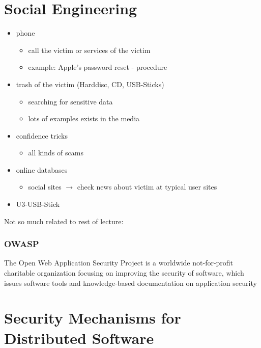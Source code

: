 \documentclass[11pt]{article}
\begin{document}
\section{Social Engineering}
\label{sec:org70df883}
\begin{itemize}
\item phone
\begin{itemize}
\item call the victim or services of the victim
\item example: Apple's password reset - procedure
\end{itemize}
\item trash of the victim (Harddisc, CD, USB-Sticks)
\begin{itemize}
\item searching for sensitive data
\item lots of examples exists in the media
\end{itemize}
\item confidence tricks
\begin{itemize}
\item all kinds of scams
\end{itemize}
\item online databases
\begin{itemize}
\item social sites \(\rightarrow\) check news about victim at typical user sites
\end{itemize}
\item U3-USB-Stick
\end{itemize}
Not so much related to rest of lecture: 
\subsubsection{OWASP}
\label{sec:org8531407}
The Open Web Application Security Project is a worldwide not-for-profit charitable organization focusing on improving the security of software, which issues software tools and knowledge-based documentation on application security

\section{Security Mechanisms for Distributed Software}
\label{sec:org7815e0f}
\end{document}
